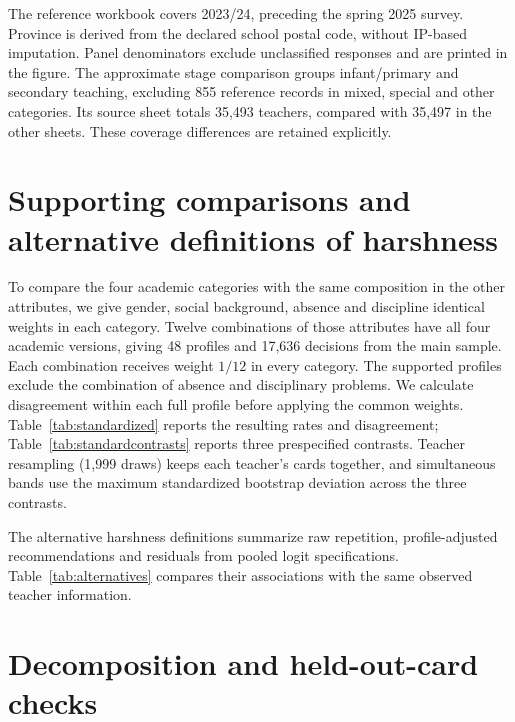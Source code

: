 The reference workbook covers 2023/24, preceding the spring 2025 survey. Province is derived from the declared school postal code, without IP-based imputation. Panel denominators exclude unclassified responses and are printed in the figure. The approximate stage comparison groups infant/primary and secondary teaching, excluding 855 reference records in mixed, special and other categories. Its source sheet totals 35,493 teachers, compared with 35,497 in the other sheets. These coverage differences are retained explicitly.

\color{reused}
\section{Supporting comparisons and alternative definitions of harshness}\label{app:harshness}
To compare the four academic categories with the same composition in the other attributes, we give gender, social background, absence and discipline identical weights in each category. Twelve combinations of those attributes have all four academic versions, giving 48 profiles and 17,636 decisions from the main sample. Each combination receives weight $1/12$ in every category. The supported profiles exclude the combination of absence and disciplinary problems. We calculate disagreement within each full profile before applying the common weights. Table~\ref{tab:standardized} reports the resulting rates and disagreement; Table~\ref{tab:standardcontrasts} reports three prespecified contrasts. Teacher resampling (1,999 draws) keeps each teacher's cards together, and simultaneous bands use the maximum standardized bootstrap deviation across the three contrasts.
\FloatBarrier

The alternative harshness definitions summarize raw repetition, profile-adjusted recommendations and residuals from pooled logit specifications. Table~\ref{tab:alternatives} compares their associations with the same observed teacher information.

{\scriptsize{}}

\section{Decomposition and held-out-card checks}\label{app:prediction}
